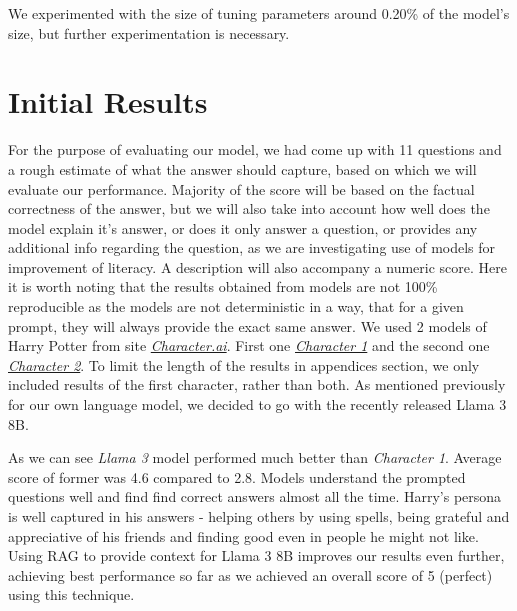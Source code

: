 \documentclass[fleqn,moreauthors,10pt]{ds_report}
\begin{document}
    We experimented with the size of tuning parameters around 0.20\% of the model's size, but further experimentation is necessary.
    
\section*{Initial Results}
    For the purpose of evaluating our model, we had come up with 11 questions and a rough estimate of what the answer should capture, based on which we will evaluate our performance. Majority of the score will be based on the factual correctness of the answer, but we will also take into account how well does the model explain it's answer, or does it only answer a question, or provides any additional info regarding the question, as we are investigating use of models for improvement of literacy. A description will also accompany a numeric score.  Here it is worth noting that the results obtained from models are not 100\% reproducible as the models are not deterministic in a way, that for a given prompt, they will always provide the exact same answer.
    We used 2 models of Harry Potter from site \emph{\href{https://character.ai/}{Character.ai}}. First one \emph{\href{https://character.ai/chat/suAUJzAPwFm-rDAAzKByHqAN64dYBg__lC_83ClfBzg}{Character 1}} and the second one \emph{\href{https://character.ai/chat/Cjdzsed_OPFbMN9UJIlmuau-Ikgpx1LKj8iEgEue68g}{Character 2}}. To limit the length of the results in appendices section, we only included results of the first character, rather than both.
    As mentioned previously for our own language model, we decided to go with the recently released Llama 3 8B.
    
    As we can see \textit{Llama 3} model performed much better than \textit{Character 1}. Average score of former was 4.6 compared to 2.8. Models understand the prompted questions well and find find correct answers almost all the time. Harry's persona is well captured in his answers - helping others by using spells, being grateful and appreciative of his friends and finding good even in people he might not like. Using RAG to provide context for Llama 3 8B improves our results even further, achieving best performance so far as we achieved an overall score of 5 (perfect) using this technique.
\end{document}
